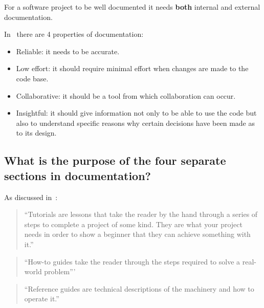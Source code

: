 For a software project to be well documented it needs \textbf{both} internal and
external documentation.


In~\cite{martraire2019living} there are 
4 properties of documentation:
\begin{itemize}
\item 

Reliable: it needs to be accurate.

\item 

Low effort: it should require minimal effort when changes are made to the code
base.

\item 

Collaborative: it should be a tool from which collaboration can occur.

\item 

Insightful: it should give information not only to be able to use the code but
also to understand specific reasons why certain decisions have been made as to
its design.

\end{itemize}


\subsection{What is the purpose of the four separate sections in documentation?}
\label{\detokenize{building-tools/06-documentation/why/main:what-is-the-purpose-of-the-four-separate-sections-in-documentation}}

As discussed in~\cite{Procida_Diataxis_documentation_framework}:
\begin{quote}


``Tutorials are lessons that take the reader by the hand through a series of
steps to complete a project of some kind. They are what your project needs in
order to show a beginner that they can achieve something with it.''
\end{quote}


\begin{quote}
``How-to guides take the reader through the steps required to solve a
real-world problem'''
\end{quote}

\begin{quote}
``Reference guides are technical descriptions of the machinery and how to
operate it.''
\end{quote}

